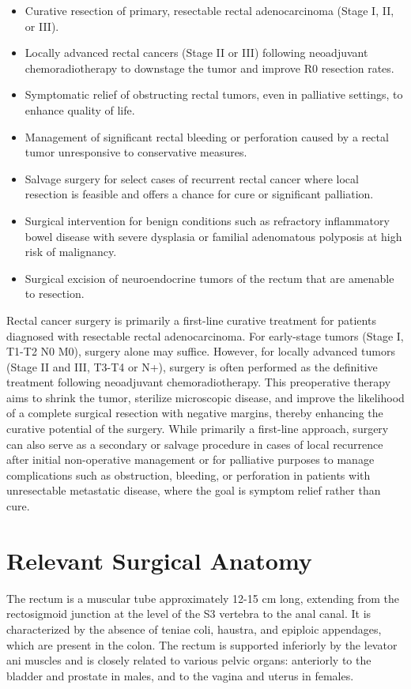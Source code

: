 \begin{itemize}
  \item Curative resection of primary, resectable rectal adenocarcinoma (Stage I, II, or III).
  \item Locally advanced rectal cancers (Stage II or III) following neoadjuvant chemoradiotherapy to downstage the tumor and improve R0 resection rates.
  \item Symptomatic relief of obstructing rectal tumors, even in palliative settings, to enhance quality of life.
  \item Management of significant rectal bleeding or perforation caused by a rectal tumor unresponsive to conservative measures.
  \item Salvage surgery for select cases of recurrent rectal cancer where local resection is feasible and offers a chance for cure or significant palliation.
  \item Surgical intervention for benign conditions such as refractory inflammatory bowel disease with severe dysplasia or familial adenomatous polyposis at high risk of malignancy.
  \item Surgical excision of neuroendocrine tumors of the rectum that are amenable to resection.
\end{itemize}

Rectal cancer surgery is primarily a first-line curative treatment for patients diagnosed with resectable rectal adenocarcinoma. For early-stage tumors (Stage I, T1-T2 N0 M0), surgery alone may suffice. However, for locally advanced tumors (Stage II and III, T3-T4 or N+), surgery is often performed as the definitive treatment following neoadjuvant chemoradiotherapy. This preoperative therapy aims to shrink the tumor, sterilize microscopic disease, and improve the likelihood of a complete surgical resection with negative margins, thereby enhancing the curative potential of the surgery. While primarily a first-line approach, surgery can also serve as a secondary or salvage procedure in cases of local recurrence after initial non-operative management or for palliative purposes to manage complications such as obstruction, bleeding, or perforation in patients with unresectable metastatic disease, where the goal is symptom relief rather than cure.

\section*{Relevant Surgical Anatomy}
The rectum is a muscular tube approximately 12-15 cm long, extending from the rectosigmoid junction at the level of the S3 vertebra to the anal canal. It is characterized by the absence of teniae coli, haustra, and epiploic appendages, which are present in the colon. The rectum is supported inferiorly by the levator ani muscles and is closely related to various pelvic organs: anteriorly to the bladder and prostate in males, and to the vagina and uterus in females. 

